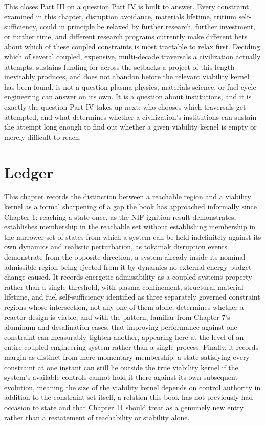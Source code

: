\documentclass[11pt]{book}
\begin{document}
This closes Part III on a question Part IV is built to answer. Every constraint examined in this chapter, disruption avoidance, materials lifetime, tritium self-sufficiency, could in principle be relaxed by further research, further investment, or further time, and different research programs currently make different bets about which of these coupled constraints is most tractable to relax first. Deciding which of several coupled, expensive, multi-decade traversals a civilization actually attempts, sustains funding for across the setbacks a project of this length inevitably produces, and does not abandon before the relevant viability kernel has been found, is not a question plasma physics, materials science, or fuel-cycle engineering can answer on its own. It is a question about institutions, and it is exactly the question Part IV takes up next: who chooses which traversals get attempted, and what determines whether a civilization's institutions can sustain the attempt long enough to find out whether a given viability kernel is empty or merely difficult to reach.

\section{Ledger}

This chapter records the distinction between a reachable region and a viability kernel as a formal sharpening of a gap the book has approached informally since Chapter 1: reaching a state once, as the NIF ignition result demonstrates, establishes membership in the reachable set without establishing membership in the narrower set of states from which a system can be held indefinitely against its own dynamics and realistic perturbation, as tokamak disruption events demonstrate from the opposite direction, a system already inside its nominal admissible region being ejected from it by dynamics no external energy-budget change caused. It records energetic admissibility as a coupled systems property rather than a single threshold, with plasma confinement, structural material lifetime, and fuel self-sufficiency identified as three separately governed constraint regions whose intersection, not any one of them alone, determines whether a reactor design is viable, and with the pattern, familiar from Chapter 7's aluminum and desalination cases, that improving performance against one constraint can measurably tighten another, appearing here at the level of an entire coupled engineering system rather than a single process. Finally, it records margin as distinct from mere momentary membership: a state satisfying every constraint at one instant can still lie outside the true viability kernel if the system's available controls cannot hold it there against its own subsequent evolution, meaning the size of the viability kernel depends on control authority in addition to the constraint set itself, a relation this book has not previously had occasion to state and that Chapter 11 should treat as a genuinely new entry rather than a restatement of reachability or stability alone.
\end{document}
